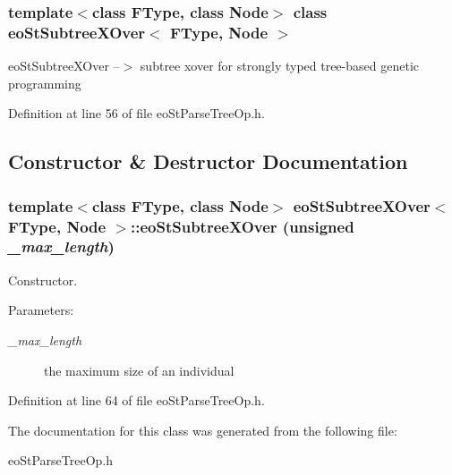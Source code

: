 \subsubsection*{template$<$class FType, class Node$>$ class eo\-St\-Subtree\-XOver$<$ FType, Node $>$}

eo\-St\-Subtree\-XOver --$>$ subtree xover for strongly typed tree-based genetic programming 



Definition at line 56 of file eo\-St\-Parse\-Tree\-Op.h.

\subsection{Constructor \& Destructor Documentation}
\subsubsection{\setlength{\rightskip}{0pt plus 5cm}template$<$class FType, class Node$>$ {\bf eo\-St\-Subtree\-XOver}$<$ FType, Node $>$::{\bf eo\-St\-Subtree\-XOver} (unsigned {\em \_\-max\_\-length})\hspace{0.3cm}{\tt  [inline]}}\label{classeo_st_subtree_x_over_a0}


Constructor. 

\begin{Desc}
\item[Parameters:]
\begin{description}
\item[{\em \_\-max\_\-length}]the maximum size of an individual \end{description}
\end{Desc}


Definition at line 64 of file eo\-St\-Parse\-Tree\-Op.h.

The documentation for this class was generated from the following file:\begin{CompactItemize}
\item 
eo\-St\-Parse\-Tree\-Op.h\end{CompactItemize}
